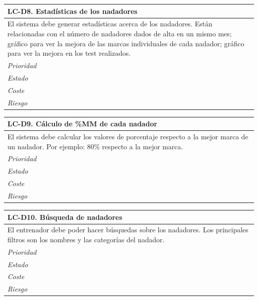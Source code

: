 	\begin{center}
		\begin{tabularx}{15cm}{|X|}
			\hline 
				\bf{LC-D8. Estadísticas de los nadadores}\\
			\hline
				El sistema debe generar estadísticas acerca de los nadadores. Están relacionadas con el número de nadadores dados de alta en un mismo mes; gráfico para ver la mejora de las marcas individuales de cada nadador; gráfico para ver la mejora en los test realizados.\\
			\hline
				\it{Prioridad}\\
			\hline
				\it{Estado}\\
			\hline
				\it{Coste}\\
			\hline
				\it{Riesgo}\\
			\hline
		\end{tabularx}
	\end{center}
	
	\begin{center}
		\begin{tabularx}{15cm}{|X|}
			\hline 
				\bf{LC-D9. Cálculo de \%MM de cada nadador}\\
			\hline
				El sistema debe calcular los valores de porcentaje respecto a la mejor marca de un nadador. Por ejemplo: 80\% respecto a la mejor marca.\\
			\hline
				\it{Prioridad}\\
			\hline
				\it{Estado}\\
			\hline
				\it{Coste}\\
			\hline
				\it{Riesgo}\\
			\hline
		\end{tabularx}
	\end{center}
	
	\begin{center}
		\begin{tabularx}{15cm}{|X|}
			\hline 
				\bf{LC-D10. Búsqueda de nadadores}\\
			\hline
				El entrenador debe poder hacer búsquedas sobre los nadadores. Los principales filtros son los nombres y las categorías del nadador.\\
			\hline
				\it{Prioridad}\\
			\hline
				\it{Estado}\\
			\hline
				\it{Coste}\\
			\hline
				\it{Riesgo}\\
			\hline
		\end{tabularx}
	\end{center}
	
